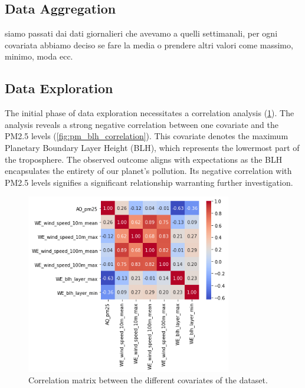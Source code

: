 \documentclass[12pt,a4paper]{article}
\begin{document}
\subsection{Data Aggregation}
siamo passati dai dati giornalieri che avevamo a quelli settimanali, per ogni covariata abbiamo deciso se fare la media o prendere altri valori come massimo, minimo, moda ecc. 

\subsection{Data Exploration}
The initial phase of data exploration necessitates a correlation analysis (\cref{fig:correlation_matrix}). The analysis reveals a strong negative correlation between one covariate and the PM2.5 levels (\cref{fig:pm_blh_correlation}). This covariate denotes the maximum Planetary Boundary Layer Height (BLH), which represents the lowermost part of the troposphere. The observed outcome aligns with expectations as the BLH encapsulates the entirety of our planet's pollution. Its negative correlation with PM2.5 levels signifies a significant relationship warranting further investigation.

\begin{figure}[h]
    \centering
    \includegraphics[width=0.8\textwidth]{./imgs/maps/covariates.png}
    \caption{Correlation matrix between the different covariates of the dataset.}
    \label{fig:correlation_matrix}
\end{figure}
\end{document}
